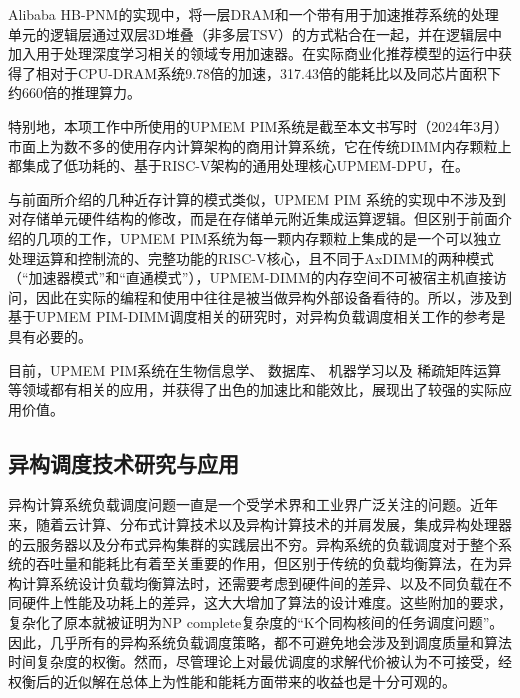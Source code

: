     Alibaba HB-PNM\citep{niu_184qpsw_2022}的实现中，将一层DRAM和一个带有用于加速推荐系统的处理单元的逻辑层通过双层3D堆叠（非多层TSV）的方式粘合在一起，并在逻辑层中加入用于处理深度学习相关的领域专用加速器。在实际商业化推荐模型的运行中获得了相对于CPU-DRAM系统9.78倍的加速，317.43倍的能耗比以及同芯片面积下约660倍的推理算力。
    
    特别地，本项工作中所使用的UPMEM PIM系统\citep{devaux_true_2019}是截至本文书写时（2024年3月）市面上为数不多的使用存内计算架构的商用计算系统，它在传统DIMM内存颗粒上都集成了低功耗的、基于RISC-V架构的通用处理核心UPMEM-DPU，在\citep{gomez-luna_benchmarking_2021}。
    
    与前面所介绍的几种近存计算的模式类似，UPMEM PIM 系统的实现中不涉及到对存储单元硬件结构的修改，而是在存储单元附近集成运算逻辑。但区别于前面介绍的几项的工作，UPMEM PIM系统为每一颗内存颗粒上集成的是一个可以独立处理运算和控制流的、完整功能的RISC-V核心，且不同于AxDIMM的两种模式（“加速器模式”和“直通模式”），UPMEM-DIMM的内存空间不可被宿主机直接访问，因此在实际的编程和使用中往往是被当做异构外部设备看待的。所以，涉及到基于UPMEM PIM-DIMM调度相关的研究时，对异构负载调度相关工作的参考是具有必要的。 

    目前，UPMEM PIM系统在生物信息学\citep{diab_framework_2023,
                                        abecassis_gapim_2023,
                                        diab_high-throughput_2022}、
                        数据库\citep{kang_pim-tree_2022, 
                                    bernhardt_pimdb_2023,
                                    lim_design_2023}、
                        机器学习\citep{gomez-luna_machine_2022,
                                    das_implementation_2022,
                                    gomez-luna_experimental_2023}以及
                        稀疏矩阵运算\citep{giannoula_sparsep_2022}
                        等领域都有相关的应用，并获得了出色的加速比和能效比，展现出了较强的实际应用价值。

    \subsection{异构调度技术研究与应用}\label{subsec:hetero_scheduling_intro}
     异构计算系统负载调度问题一直是一个受学术界和工业界广泛关注的问题。近年来，随着云计算、分布式计算技术以及异构计算技术的并肩发展，集成异构处理器的云服务器以及分布式异构集群的实践层出不穷。异构系统的负载调度对于整个系统的吞吐量和能耗比有着至关重要的作用，但区别于传统的负载均衡算法，在为异构计算系统设计负载均衡算法时，还需要考虑到硬件间的差异、以及不同负载在不同硬件上性能及功耗上的差异，这大大增加了算法的设计难度\citep{mack_performant_2022}。这些附加的要求，复杂化了原本就被证明为NP complete复杂度的“K个同构核间的任务调度问题”\citep{ullman_np-complete_1975}。因此，几乎所有的异构系统负载调度策略，都不可避免地会涉及到调度质量和算法时间复杂度的权衡。然而，尽管理论上对最优调度的求解代价被认为不可接受，经权衡后的近似解在总体上为性能和能耗方面带来的收益也是十分可观的。 

